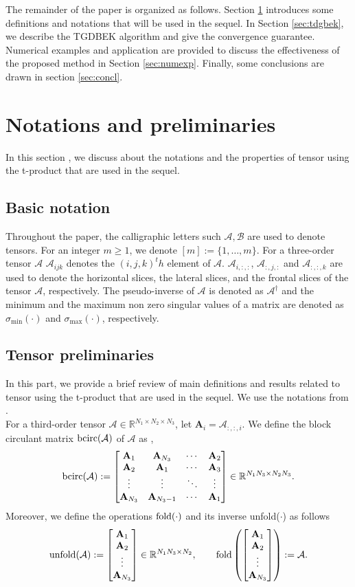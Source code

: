 \documentclass[11pt]{article}
\def\fm#1{\mathcal{#1}}
\def\m#1{\boldsymbol{#1}}
\def\r{\mathbb{R}}
\begin{document}
The remainder of the paper is organized  as follows.  Section \ref{sec:prelim} introduces some definitions and notations that will be used in the sequel. In  Section \ref{sec:tdgbek}, we describe the TGDBEK  algorithm and give the convergence guarantee.  Numerical examples and application are provided to discuss the effectiveness of the proposed method in Section \ref{sec:numexp}. Finally, some conclusions are drawn in section \ref{sec:concl}.

   
\section{Notations and preliminaries} \label{sec:prelim}
In this section , we discuss about the notations and the properties of tensor using the t-product that are  used in the sequel.
\subsection{Basic notation}
Throughout the paper,  the calligraphic letters such $\fm A, \fm B$ are used  to denote tensors. For an integer $m\geq 1$, we denote $[m]:=\{1, \ldots, m \}$. For a three-order tensor $\fm A$  $\fm A_{ijk}$ denotes the $(i, j,k)^th$ element of $\fm A$. $\fm A_{i, :, :}$, $\fm A_{:, j, :}$ and $\fm A_{:, :, k}$ are used to denote the horizontal slices, the lateral slices, and the frontal slices of the tensor $\fm A$, respectively. The pseudo-inverse of $\fm A$ is denoted as $\fm A^\dagger$ and the minimum and the maximum non zero singular values of a matrix are denoted as $\sigma_{\min}(\cdot)$ and $\sigma_{\max}(\cdot)$, respectively.


\subsection{Tensor preliminaries}
In this part, we provide  a brief review of main  definitions and results related to tensor using the t-product that are used in the sequel.  We use the notations from \cite{kilmer2011facto, kilmer2013thirdOrder}.\\
For a third-order tensor $\fm A\in \r^{N_1\times N_2\times N_3}$, let $\m A_i = \fm A_{:, :, i}$. We define the block circulant matrix  $\bcirc(\fm A)$  of $\fm A$ as ,
$$
    {\rm bcirc}(\mathcal A):=\begin{bmatrix}\mathbf A_1 &\mathbf A_{N_3} & \cdots & \mathbf A_2\\ \mathbf A_2 & \mathbf A_1 & \cdots &\mathbf A_3\\ \vdots &\vdots & \ddots &\vdots\\ \mathbf A_{N_3}& \mathbf A_{N_3-1}& \cdots &\mathbf A_1\end{bmatrix}\in\mathbb R^{N_1N_3\times N_2N_3}.
$$
Moreover, we define the operations ${\rm fold}(\cdot)$  and its inverse unfold($\cdot$) as follows
$$
{\rm unfold}(\mathcal A):=\begin{bmatrix}\mathbf A_1\\ \mathbf A_2\\ \vdots\\ \mathbf A_{N_3}\end{bmatrix}\in\mathbb R^{N_1N_3\times N_2},\qquad {\rm fold}\left(\begin{bmatrix}\mathbf A_1\\ \mathbf A_2\\ \vdots\\ \mathbf A_{N_3}\end{bmatrix}\right):=\mathcal A.
$$ 
\end{document}
